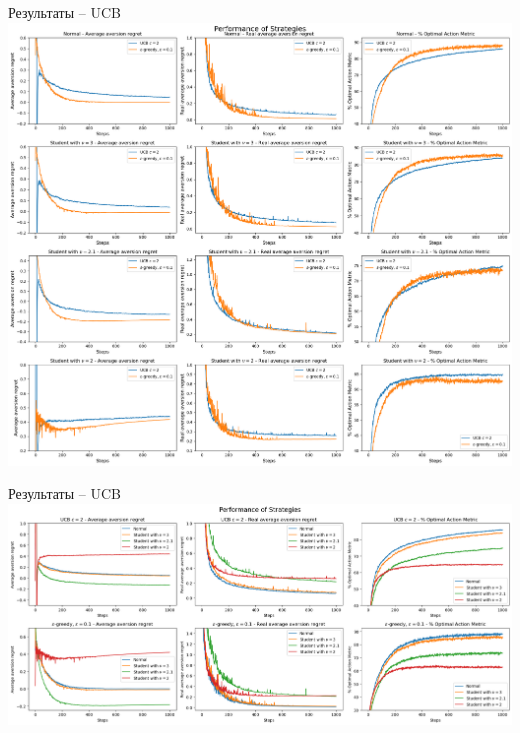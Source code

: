 \documentclass[11pt]{beamer} %
\begin{document}
    \begin{frame}{Результаты -- UCB}
        \includegraphics[scale=0.13,center]{images/theory_images/UCB/one_distr.png}
    \end{frame}
    \begin{frame}{Результаты -- UCB}
        \includegraphics[scale=0.13,center]{images/theory_images/UCB/one_strat.png}
    \end{frame}
\end{document}
